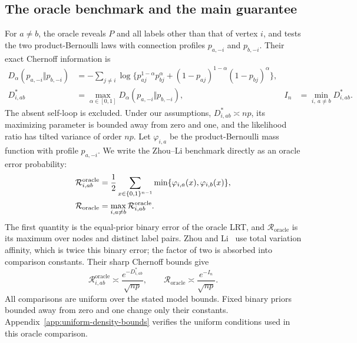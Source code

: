 \documentclass[11pt]{article}
\theoremstyle{definition}
\theoremstyle{remark}
\newcommand{\Roracle}{\mathcal R_{\mathrm{oracle}}}
\numberwithin{equation}{section}
\begin{document}
\subsection{The oracle benchmark and the main guarantee}
For $a\ne b$, the oracle reveals $P$ and all labels other than that of vertex $i$, and tests the two product-Bernoulli laws with connection profiles $p_{a,-i}$ and $p_{b,-i}$. Their exact Chernoff information is
\begin{align}
 D_\alpha(p_{a,-i}\Vert p_{b,-i})
  &=-\sum_{j\ne i}\log\{p_{aj}^{1-\alpha}p_{bj}^{\alpha}
           +(1-p_{aj})^{1-\alpha}(1-p_{bj})^{\alpha}\},
  \label{eq:chernoff-information}\\
 D^*_{i,ab}&=\max_{\alpha\in[0,1]}
                 D_\alpha(p_{a,-i}\Vert p_{b,-i}),
 &I_n&=\min_{i,\ a\ne b}D^*_{i,ab}.
 \label{eq:exact-information}
\end{align}
The absent self-loop is excluded. Under our assumptions, $D^*_{i,ab}\asymp np$, its maximizing parameter is bounded away from zero and one, and the likelihood ratio has tilted variance of order $np$. Let $\varphi_{i,a}$ be the product-Bernoulli mass function with profile $p_{a,-i}$. We write the Zhou--Li benchmark directly as an oracle error probability:
\begin{align}
 \mathcal R_{i,ab}^{\mathrm{oracle}}
   &=\frac12\sum_{x\in\{0,1\}^{n-1}}
       \min\{\varphi_{i,a}(x),\varphi_{i,b}(x)\},\notag\\
 \Roracle&=\max_{i,a\ne b}\mathcal R_{i,ab}^{\mathrm{oracle}}.
 \label{eq:oracle-error-definition}
\end{align}
The first quantity is the equal-prior binary error of the oracle LRT, and $\Roracle$ is its maximum over nodes and distinct label pairs. Zhou and Li~\citep{zhouli2020} use total variation affinity, which is twice this binary error; the factor of two is absorbed into comparison constants. Their sharp Chernoff bounds give
\begin{equation}
 \mathcal R_{i,ab}^{\mathrm{oracle}}\asymp\frac{e^{-D^*_{i,ab}}}{\sqrt{np}},\qquad
 \Roracle\asymp\frac{e^{-I_n}}{\sqrt{np}}.
 \label{eq:oracle-risk}
\end{equation}
All comparisons are uniform over the stated model bounds. Fixed binary priors bounded away from zero and one change only their constants. Appendix~\ref{app:uniform-density-bounds} verifies the uniform conditions used in this oracle comparison.
\end{document}
